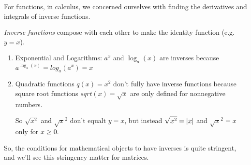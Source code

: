 \documentclass{ximera}
\begin{document}
\begin{example}

  For functions, in calculus, we concerned ourselves with finding the derivatives and integrals of inverse functions.

  \emph{Inverse functions} compose with each other to make the identity function (e.g. $y=x$). 

  \begin{enumerate}
  
    \item Exponential and Logarithms: $a^x$ and $\log_a(x)$ are inverses because $a^{\log_a(x)}=log_a(a^x)=x$
    
    \item Quadratic functions $q(x)=x^2$ don't fully have inverse functions because square root functions $sqrt(x)=\sqrt{x}$ are only defined for nonnegative numbers.
    
    So $\sqrt{x^2}$ and $\sqrt{x}^2$ don't equalt $y=x$, but instead $\sqrt{x^2}=\left|x\right|$ and $\sqrt{x}^2=x$ only for $x\geq 0$.

  \end{enumerate}

\end{example}

So, the conditions for mathematical objects to have inverses is quite stringent, and we'll see this stringency matter for matrices. 
\end{document}
